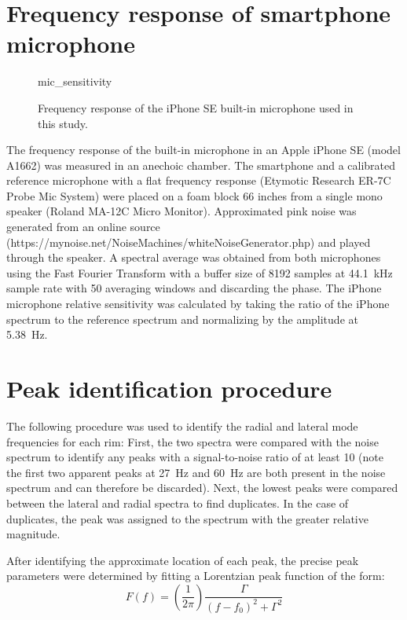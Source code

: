 \documentclass[../../thesis.tex]{subfiles}
\begin{document}
\section{Frequency response of smartphone microphone}
\label{app:mic_cal}

\begin{figure}[h]
\centering
{mic_sensitivity}
\caption{Frequency response of the iPhone SE built-in microphone used in this study.}
\label{fig:mic_sensitivity}
\end{figure}

The frequency response of the built-in microphone in an Apple iPhone SE (model A1662) was measured in an anechoic chamber. The smartphone and a calibrated reference microphone with a flat frequency response (Etymotic Research ER-7C Probe Mic System) were placed on a foam block 66 inches from a single mono speaker (Roland MA-12C Micro Monitor). Approximated pink noise was generated from an online source (https://mynoise.net/NoiseMachines/whiteNoiseGenerator.php) and played through the speaker. A spectral average was obtained from both microphones using the Fast Fourier Transform with a buffer size of 8192 samples at \SI{44.1}{kHz} sample rate with 50 averaging windows and discarding the phase. The iPhone microphone relative sensitivity was calculated by taking the ratio of the iPhone spectrum to the reference spectrum and normalizing by the amplitude at \SI{5.38}{Hz}.

\section{Peak identification procedure}
\label{app:peak_fits}

The following procedure was used to identify the radial and lateral mode frequencies for each rim: First, the two spectra were compared with the noise spectrum to identify any peaks with a signal-to-noise ratio of at least 10 (note the first two apparent peaks at \SI{27}{Hz} and \SI{60}{Hz} are both present in the noise spectrum and can therefore be discarded). Next, the lowest peaks were compared between the lateral and radial spectra to find duplicates. In the case of duplicates, the peak was assigned to the spectrum with the greater relative magnitude.

After identifying the approximate location of each peak, the precise peak parameters were determined by fitting a Lorentzian peak function of the form:
\begin{equation}
\label{eq:ema_peak_fit}
F(f) = \left(\frac{1}{2\pi}\right) \frac{\Gamma}{(f-f_0)^2 + \Gamma^2}
\end{equation}
\end{document}
